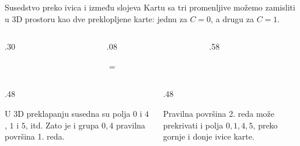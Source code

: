 \begin{frame}[label=02-s040]{Susedstvo preko ivica i između slojeva}
\setlength{\parskip}{0pt}
Kartu sa tri promenljive možemo zamisliti u 3D prostoru kao dve preklopljene karte: jednu za \(C=0\), a drugu za \(C=1\).
\par\vspace{1mm}
\begin{columns}[T,onlytextwidth]
\begin{column}{.30\textwidth}\centering

\end{column}
\begin{column}{.08\textwidth}\centering\vspace{15mm}\par \(=\)\end{column}
\begin{column}{.58\textwidth}\raggedright

\end{column}
\end{columns}
\par\vspace{3mm}
\begin{columns}[T,onlytextwidth]
\begin{column}{.48\textwidth}
\begin{minipage}[c]{.61\linewidth}\raggedright
{}\par\vspace{1mm}
U 3D preklapanju susedna su polja \(0\) i \(4\), \(1\) i \(5\), itd. Zato je i grupa \(0,4\) pravilna površina 1. reda.
\end{minipage}\hfill
\begin{minipage}[c]{.36\linewidth}\centering

\end{minipage}
\end{column}
\begin{column}{.48\textwidth}
\begin{minipage}[c]{.61\linewidth}\raggedright
{}\par\vspace{1mm}
Pravilna površina 2. reda može prekrivati i polja \(0,1,4,5\), preko gornje i donje ivice karte.
\end{minipage}\hfill
\begin{minipage}[c]{.36\linewidth}\centering

\end{minipage}
\end{column}
\end{columns}
\end{frame}

